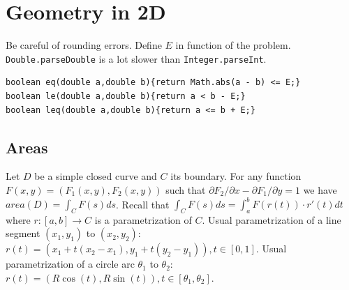 \section{Geometry in 2D}
Be careful of rounding errors. Define $E$ in function of the problem.
\lstinline|Double.parseDouble| is a lot slower than \lstinline|Integer.parseInt|.
\begin{lstlisting}
boolean eq(double a,double b){return Math.abs(a - b) <= E;}
boolean le(double a,double b){return a < b - E;}
boolean leq(double a,double b){return a <= b + E;}
\end{lstlisting}
\subsection{Areas}
Let $D$ be a simple closed curve and $C$ its boundary. For any
function $F(x, y) = (F_1(x, y), F_2(x, y))$ such that $\partial F_2 \slash \partial x - \partial F_1 \slash \partial y =  1$
we have $\textit{area}(D) = \int_C F(s) ds$. Recall that $\int_C F(s) ds = \int_a^b F(r(t)) \cdot r'(t) dt$ where $r : [a, b] \rightarrow C$
is a parametrization of $C$. Usual parametrization of a line segment $(x_1, y_1)$ to $(x_2, y_2)$: $r(t) = (x_1 + t(x_2 - x_1), y_1 + t(y_2 - y_1)), t \in [0, 1]$. Usual parametrization
of a circle arc $\theta_1$ to $\theta_2$: $r(t) = (R \cos(t), R \sin(t)), t \in [\theta_1, \theta_2]$.

